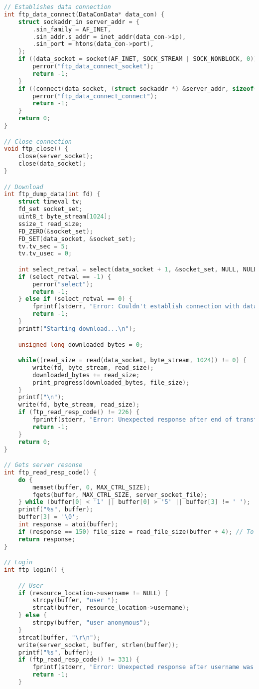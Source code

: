 \begin{lstlisting}[language=C, caption=ftp.c]
// Establishes data connection
int ftp_data_connect(DataConData* data_con) {
    struct sockaddr_in server_addr = {
        .sin_family = AF_INET,
        .sin_addr.s_addr = inet_addr(data_con->ip),
        .sin_port = htons(data_con->port),
    };
    if ((data_socket = socket(AF_INET, SOCK_STREAM | SOCK_NONBLOCK, 0)) == -1) {
        perror("ftp_data_connect_socket");
        return -1;
    } 
    if ((connect(data_socket, (struct sockaddr *) &server_addr, sizeof(server_addr)) == -1) && (errno != EINPROGRESS)) {
        perror("ftp_data_connect_connect");
        return -1;
    }
    return 0;
}

// Close connection
void ftp_close() {
    close(server_socket);
    close(data_socket);
}

// Download
int ftp_dump_data(int fd) {
    struct timeval tv;
    fd_set socket_set;
    uint8_t byte_stream[1024];
    ssize_t read_size;
    FD_ZERO(&socket_set);
    FD_SET(data_socket, &socket_set);
    tv.tv_sec = 5;
    tv.tv_usec = 0;

    int select_retval = select(data_socket + 1, &socket_set, NULL, NULL, &tv);
    if (select_retval == -1) {
        perror("select");
        return -1;
    } else if (select_retval == 0) {
        fprintf(stderr, "Error: Couldn't establish connection with data link.\n");
        return -1;
    }
    printf("Starting download...\n");

    unsigned long downloaded_bytes = 0;

    while((read_size = read(data_socket, byte_stream, 1024)) != 0) {
        write(fd, byte_stream, read_size);
        downloaded_bytes += read_size;
        print_progress(downloaded_bytes, file_size);
    }
    printf("\n");
    write(fd, byte_stream, read_size);
    if (ftp_read_resp_code() != 226) {
        fprintf(stderr, "Error: Unexpected response after end of transfer!\n");
        return -1;
    }
    return 0;
}

// Gets server resonse
int ftp_read_resp_code() {
    do {
        memset(buffer, 0, MAX_CTRL_SIZE);
        fgets(buffer, MAX_CTRL_SIZE, server_socket_file);
    } while (buffer[0] < '1' || buffer[0] > '5' || buffer[3] != ' ');
    printf("%s", buffer);
    buffer[3] = '\0';
    int response = atoi(buffer);
    if (response == 150) file_size = read_file_size(buffer + 4); // To print the progress percentage
    return response;
}

// Login
int ftp_login() {

    // User
    if (resource_location->username != NULL) {
        strcpy(buffer, "user ");
        strcat(buffer, resource_location->username);
    } else {
        strcpy(buffer, "user anonymous");
    }
    strcat(buffer, "\r\n");
    write(server_socket, buffer, strlen(buffer));
    printf("%s", buffer);
    if (ftp_read_resp_code() != 331) {
        fprintf(stderr, "Error: Unexpected response after username was sent!\n");
        return -1;
    }


\end{lstlisting}
